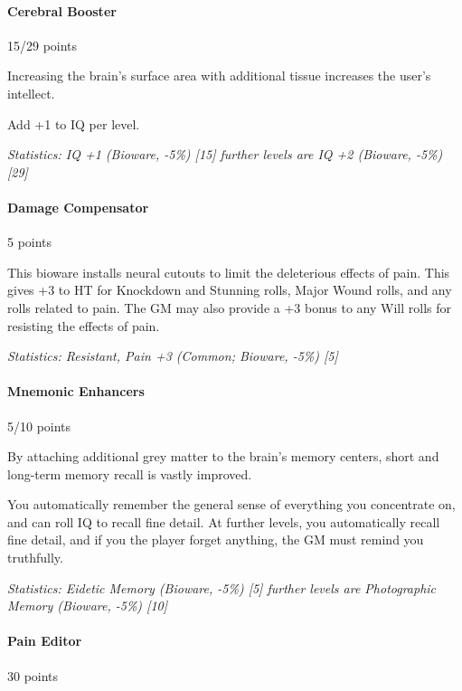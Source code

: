 \begin{multicols*}{3}
	\paragraph{Cerebral Booster}
	\begin{flushright}
		15/29 points
	\end{flushright}
	
	Increasing the brain's surface area with additional tissue increases the user's intellect. 
	
	Add +1 to IQ per level. 
	
	\textit{\textcolor{OliveGreen}{Statistics: IQ +1 (Bioware, -5\%) [15] further levels are IQ +2 (Bioware, -5\%) [29]}}
	
	\paragraph{Damage Compensator}
	\begin{flushright}
		5 points
	\end{flushright}
	
	This bioware installs neural cutouts to limit the deleterious effects of pain. This gives +3 to HT for Knockdown and Stunning rolls, Major Wound rolls, and any rolls related to pain. The GM may also provide a +3 bonus to any Will rolls for resisting the effects of pain.
	
	\textit{\textcolor{OliveGreen}{Statistics: Resistant, Pain +3 (Common; Bioware, -5\%) [5] }}
	
	\paragraph{Mnemonic Enhancers}
	\begin{flushright}
		5/10 points
	\end{flushright}
	
	By attaching additional grey matter to the brain's memory centers, short and long-term memory recall is vastly improved. 
	
	You automatically remember the general sense of everything you concentrate on, and can roll IQ to recall fine detail. At further levels, you automatically recall fine detail, and if you the player forget anything, the GM must remind you truthfully. 
	
	\textit{\textcolor{OliveGreen}{Statistics: Eidetic Memory (Bioware, -5\%) [5] further levels are Photographic Memory (Bioware, -5\%) [10]}}
	
	\paragraph{Pain Editor}\label{pain_editor}
	\begin{flushright}
		30 points
	\end{flushright}


\end{multicols*}
